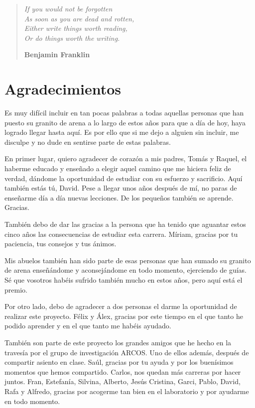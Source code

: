 \thispagestyle{empty}
\vspace*{\fill} 
\begin{quote}
\epigraph{\large \textit{If you would not be forgotten\\
As soon as you are dead and rotten, \\
Either write things worth reading, \\
Or do things worth the writing.}}{\large \flushright \textbf{Benjamin Franklin}}
\end{quote}
\vspace*{\fill} 

\afterpage{\blankpage} %

\chapter*{Agradecimientos}
Es muy difícil incluir en tan pocas palabras a todas aquellas personas que han puesto su granito de arena a lo largo de estos años para que a día de hoy, haya logrado llegar hasta aquí. Es por ello que si me dejo a alguien sin incluir, me disculpe y no dude en sentirse parte de estas palabras.

En primer lugar, quiero agradecer de corazón a mis padres, Tomás y Raquel, el haberme educado y enseñado a elegir aquel camino que me hiciera feliz de verdad, dándome la oportunidad de estudiar con su esfuerzo y sacrificio. Aquí también estás tú, David. Pese a llegar unos años después de mí, no paras de enseñarme día a día nuevas lecciones. De los pequeños también se aprende. Gracias.

También debo de dar las gracias a la persona que ha tenido que aguantar estos cinco años las consecuencias de estudiar esta carrera. Míriam, gracias por tu paciencia, tus consejos y tus ánimos. 

Mis abuelos también han sido parte de esas personas que han sumado su granito de arena enseñándome y aconsejándome en todo momento, ejerciendo de guías. Sé que vosotros habéis sufrido también mucho en estos años, pero aquí está el premio.

Por otro lado, debo de agradecer a dos personas el darme la oportunidad de realizar este proyecto. Félix y Álex, gracias por este tiempo en el que tanto he podido aprender y en el que tanto me habéis ayudado.

También son parte de este proyecto los grandes amigos que he hecho en la travesía por el grupo de investigación ARCOS. Uno de ellos además, después de compartir asiento en clase. Saúl, gracias por tu ayuda y por los buenísimos momentos que hemos compartido. Carlos, nos quedan más carreras por hacer juntos. Fran, Estefanía, Silvina, Alberto, Jesús Cristina, Garci, Pablo, David, Rafa y Alfredo, gracias por acogerme tan bien en el laboratorio y por ayudarme en todo momento.

